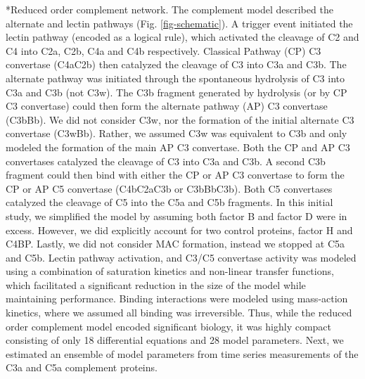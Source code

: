 \documentclass[12pt]{article}
\makeatletter
\renewcommand\subsection{\@startsection
	{subsection}{2}{0mm}
	{-0.05in}
	{-0.5\baselineskip}
	{\normalfont\normalsize\bfseries}}
\makeatother
\begin{document}
\subsection*{Reduced order complement network.}
The complement model described the alternate and lectin pathways (Fig. \ref{fig-schematic}).
A trigger event initiated the lectin pathway (encoded as a logical rule), which activated the cleavage of C2 and C4 into C2a, C2b, C4a and C4b respectively.
Classical Pathway (CP) C3 convertase (C4aC2b) then catalyzed the cleavage of C3 into C3a and C3b.
The alternate pathway was initiated through the spontaneous hydrolysis of C3 into C3a and C3b (not C3w).
The C3b fragment generated by hydrolysis (or by CP C3 convertase) could then form the alternate pathway (AP) C3 convertase (C3bBb).
We did not consider C3w, nor the formation of the initial alternate C3 convertase (C3wBb).
Rather, we assumed C3w was equivalent to C3b and only modeled the formation of the main AP C3 convertase.
Both the CP and AP C3 convertases catalyzed the cleavage of C3 into C3a and C3b.
A second C3b fragment could then bind with either the CP or AP C3 convertase to form the CP or AP C5 convertase (C4bC2aC3b or C3bBbC3b).
Both C5 convertases catalyzed the cleavage of C5 into the C5a and C5b fragments.
In this initial study, we simplified the model by assuming both factor B and factor D were in excess.
However, we did explicitly account for two control proteins, factor H and C4BP.
Lastly, we did not consider MAC formation, instead we stopped at C5a and C5b.
Lectin pathway activation, and C3/C5 convertase activity was modeled using a combination of saturation kinetics and non-linear transfer functions, which facilitated a significant reduction in the size of the model while maintaining performance.
Binding interactions were modeled using mass-action kinetics, where we assumed all binding was irreversible.
Thus, while the reduced order complement model encoded significant biology, it was highly compact consisting of only 18 differential equations and 28 model parameters.
Next, we estimated an ensemble of model parameters from time series measurements of the C3a and C5a complement proteins.
\end{document}
